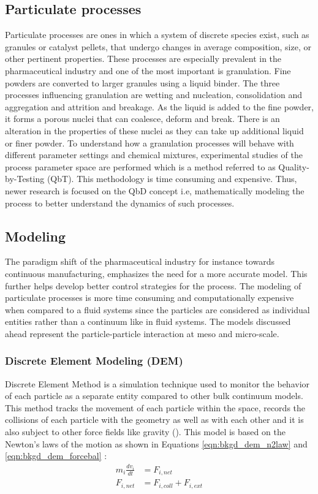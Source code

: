 \documentclass[preprint,11pt,authoryear]{elsarticle}
\begin{document}
\subsection{Particulate processes}
Particulate processes are ones in which a system of discrete species exist, such as granules 
or catalyst pellets, that undergo changes in average composition, size, or other pertinent 
properties. These processes are especially prevalent in the pharmaceutical industry and one of the 
most important is granulation. 
Fine powders are converted to larger granules using a liquid binder. The three processes 
influencing granulation are wetting and nucleation, consolidation and aggregation and attrition and 
breakage\citep{Iveson2001}\citep{Cameron2005}. As the liquid is added to the fine powder, it 
forms a porous nuclei that can coalesce, deform and break\citep{Barrasso2015ces}. There is an 
alteration in the properties of these nuclei as they can take up additional liquid or finer powder.
To understand how a granulation processes will behave with different parameter settings and 
chemical mixtures, experimental studies of the process parameter space are performed which is a 
method referred to as Quality-by-Testing (QbT). This methodology is time consuming and 
expensive. Thus, newer research is focused on the QbD concept i.e, 
mathematically modeling the process to better understand the dynamics of such processes.

\subsection{Modeling}
The paradigm shift of the pharmaceutical industry for instance towards continuous manufacturing, 
emphasizes the need for a more accurate model. This further helps develop better control strategies 
for the process. The modeling of particulate processes is more time consuming and computationally 
expensive when compared to a fluid systems since the particles are considered as individual entities 
rather than a continuum like in fluid systems. The models discussed ahead represent the 
particle-particle interaction at meso and micro-scale.
\subsubsection{Discrete Element Modeling (DEM)}
 Discrete Element Method is a simulation technique used to monitor the behavior of each particle 
as a separate entity compared to other bulk continuum models. This method tracks the movement of 
each particle within the space, records the collisions of each particle with the geometry as well 
as with each other and it is also subject to other force fields like gravity (\cite{Barrasso2015cerd}). This 
model is based on the Newton's laws of the motion as shown in Equations 
\ref{eqn:bkgd_dem_n2law} and  \ref{eqn:bkgd_dem_forcebal} : \\
\begin{align}
m_i\frac{dv_i}{dt} &= F_{i,net} \label{eqn:bkgd_dem_n2law} \\
F_{i,net} &=  F_{i,coll} +  F_{i,ext} \label{eqn:bkgd_dem_forcebal}
\end{align}
\end{document}

